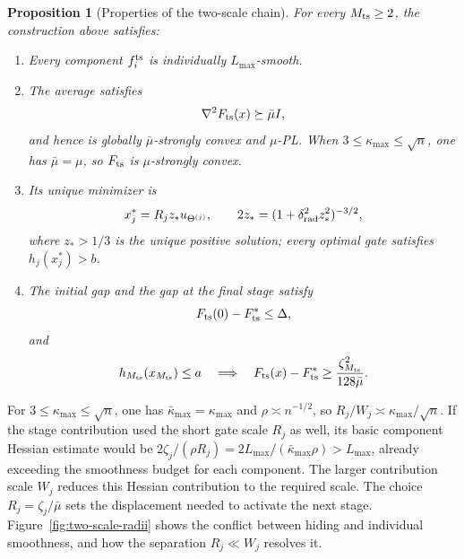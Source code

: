 \documentclass{article}
\newtheorem{proposition}[theorem]{Proposition}
\theoremstyle{definition}
\begin{document}
\begin{proposition}[Properties of the two-scale chain]
\label{prop:two-scale-chain-properties}
For every $M_{\rm ts}\ge2$, the construction above satisfies:
\begin{enumerate}[label=\textup{(\roman*)},leftmargin=*,itemsep=2pt]
 \item\label{item:two-scale-property-smoothness}
 Every component $f_i^{\rm ts}$ is individually $L_{\max}$-smooth.
 \item\label{item:two-scale-property-convexity}
 The average satisfies
 \begin{equation}
  \nabla^2F_{\rm ts}(x)
  \succeq\bar\mu I,
  \label{eq:two-scale-property-convexity}
 \end{equation}
 and hence is globally $\bar\mu$-strongly convex and $\mu$-PL.  When
 $3\le\kappa_{\max}\le\sqrt n$, one has $\bar\mu=\mu$, so
 $F_{\rm ts}$ is $\mu$-strongly convex.
 \item\label{item:two-scale-property-minimizer}
 Its unique minimizer is
 \begin{equation}
  x_j^*=R_jz_*u_{\Theta^{(j)}},
  \qquad
  2z_*=(1+\delta_{\rm rad}^2z_*^2)^{-3/2},
  \label{eq:two-scale-property-minimizer}
 \end{equation}
 where $z_*>1/3$ is the unique positive solution; every optimal gate satisfies
 $h_j(x_j^*)>b$.
 \item\label{item:two-scale-property-gaps}
 The initial gap and the gap at the final stage satisfy
 \begin{equation}
  F_{\rm ts}(0)-F_{\rm ts}^*\le\Delta,
  \label{eq:two-scale-property-initial-gap}
 \end{equation}
 and
 \begin{equation}
  h_{M_{\rm ts}}(x_{M_{\rm ts}})\le a
  \quad\Longrightarrow\quad
  F_{\rm ts}(x)-F_{\rm ts}^*
  \ge\frac{\zeta_{M_{\rm ts}}^2}{128\bar\mu}.
  \label{eq:two-scale-property-terminal-gap}
 \end{equation}
\end{enumerate}
\end{proposition}

For $3\le\kappa_{\max}\le\sqrt n$, one has
$\bar\kappa_{\max}=\kappa_{\max}$ and $\rho\asymp n^{-1/2}$, so
$R_j/W_j\asymp\kappa_{\max}/\sqrt n$.  If the stage contribution used the
short gate scale $R_j$ as well, its basic component Hessian estimate would be
$2\zeta_j/(\rho R_j)=2L_{\max}/(\bar\kappa_{\max}\rho)>L_{\max}$, already
exceeding the smoothness budget for each component.  The larger contribution scale
$W_j$ reduces this Hessian contribution to the required scale.  The choice
$R_j=\zeta_j/\bar\mu$ sets the displacement needed to activate the next stage.
Figure~\ref{fig:two-scale-radii} shows the conflict between hiding and
individual smoothness, and how the separation $R_j\ll W_j$ resolves it.
\end{document}
